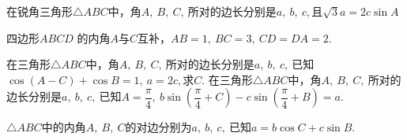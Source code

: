\begin{questions}
\kongbai
\qs 在锐角三角形$\triangle ABC$中，角$A,\ B,\ C,\ $所对的边长分别是$a,\ b,\ c,$且$ \sqrt{3}a=2c\sin A $
\kongbai
\qs 四边形$ ABCD $ 的内角$ A $与$ C $互补，$ AB=1,\ BC=3,\ CD=DA=2. $
\kongbai
\qs 在三角形$\triangle ABC$中，角$A,\ B,\ C,\ $所对的边长分别是$a,\ b,\ c,\ $已知$ \cos (A-C)+\cos B=1,\ a=2c, $求$ C $.
\kongbai
\qs 在三角形$\triangle ABC$中，角$A,\ B,\ C,\ $所对的边长分别是$a,\ b,\ c,\ $已知$ A=\dfrac{\pi}{4},\ b\sin \left(\dfrac{\pi}{4}+C\right)-c\sin \left(\dfrac{\pi}{4}+B\right)=a. $
\kongbai
\qs $\triangle ABC$中的内角$ A,\ B,\ C $的对边分别为$ a,\ b,\ c,\  $已知$ a=b\cos C+c\sin B $.
\begin{parts}

\end{parts}
\end{questions}

